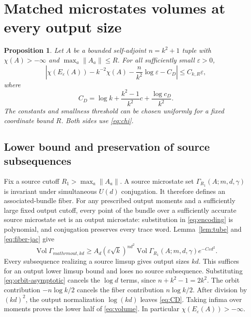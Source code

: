 \documentclass[11pt]{article}
\newtheorem{proposition}[theorem]{Proposition}
\theoremstyle{definition}\newtheorem{definition}[theorem]{Definition}
\theoremstyle{remark}\newtheorem{remark}[theorem]{Remark}
\DeclareMathOperator{\Vol}{Vol}\DeclareMathOperator{\rank}{rank}
\newcommand{\eps}{\varepsilon}\newcommand{\id}{\mathrm{id}}
\begin{document}
\section{Matched microstates volumes at every output size}
\label{sec:volume}
\begin{proposition}\label{prop:volume}
Let $A$ be a bounded self-adjoint $n=k^2+1$ tuple with $\chi(A)>-\infty$
and $\max_a\|A_a\|\leq R$. For all sufficiently small $\eps>0$,
\begin{equation}\label{eq:volume}
 \left|\chi(E_\eps(A))-k^{-2}\chi(A)
       -\frac n{k^2}\log\eps-C_D\right|\leq C_{k,R}\eps,
\end{equation}
where
\begin{equation}\label{eq:CD}
 C_D=\log k+\frac{k^2-1}{k^2}c+\frac{\log c_D}{k^2}.
\end{equation}
The constants and smallness threshold can be chosen uniformly for a
fixed coordinate bound $R$. Both sides use \eqref{eq:chi}.
\end{proposition}

\subsection{Lower bound and preservation of source subsequences}
Fix a source cutoff $R_1>\max_a\|A_a\|$. A source microstate set
$\Gamma_{R_1}(A;m,d,\gamma)$ is invariant under simultaneous $U(d)$
conjugation. It therefore defines an associated-bundle fiber.
For any prescribed output moments and a sufficiently large fixed output
cutoff, every point of the bundle over a sufficiently accurate source
microstate set is an output microstate: substitution in
\eqref{eq:encoding} is polynomial, and conjugation preserves every
trace word. Lemma~\ref{lem:tube} and \eqref{eq:fiber-jac} give
\begin{equation}\label{eq:lower-volume}
 \Vol\Gamma_{mathrm{out},kd}
 \geq A_d(\eps\sqrt k)^{nd^2}
       \Vol\Gamma_{R_1}(A;m,d,\gamma)e^{-C\eps d^2}.
\end{equation}
Every subsequence realizing a source limsup gives output sizes $kd$.
This suffices for an output lower limsup bound and loses no source
subsequence. Substituting \eqref{eq:orbit-asymptotic} cancels the
$\log d$ terms, since $n+k^2-1=2k^2$. The orbit contribution
$-n\log k/2$ cancels the fiber contribution $n\log k/2$.
After division by $(kd)^2$, the output normalization $\log(kd)$ leaves
\eqref{eq:CD}. Taking infima over moments proves the lower half of
\eqref{eq:volume}. In particular $\chi(E_\eps(A))> -\infty$.
\end{document}

